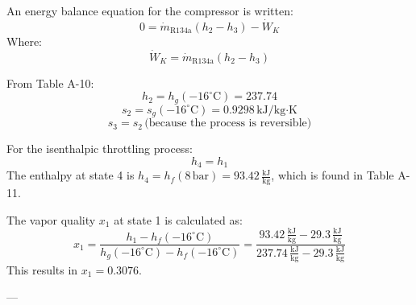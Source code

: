 An energy balance equation for the compressor is written:  
\[
0 = \dot{m}_{\text{R134a}} \left( h_2 - h_3 \right) - \dot{W}_K
\]  
Where:  
\[
\dot{W}_K = \dot{m}_{\text{R134a}} \left( h_2 - h_3 \right)
\]  

From Table A-10:  
\[
h_2 = h_g(-16^\circ \text{C}) = 237.74  
\]  
\[
s_2 = s_g(-16^\circ \text{C}) = 0.9298 \, \text{kJ/kg·K}  
\]  
\[
s_3 = s_2 \, \text{(because the process is reversible)}  
\]

For the isenthalpic throttling process:  
\[
h_4 = h_1
\]
The enthalpy at state 4 is \( h_4 = h_f(8 \, \text{bar}) = 93.42 \, \frac{\text{kJ}}{\text{kg}} \), which is found in Table A-11.  

The vapor quality \( x_1 \) at state 1 is calculated as:  
\[
x_1 = \frac{h_1 - h_f(-16^\circ \text{C})}{h_g(-16^\circ \text{C}) - h_f(-16^\circ \text{C})} = \frac{93.42 \, \frac{\text{kJ}}{\text{kg}} - 29.3 \, \frac{\text{kJ}}{\text{kg}}}{237.74 \, \frac{\text{kJ}}{\text{kg}} - 29.3 \, \frac{\text{kJ}}{\text{kg}}}
\]
This results in \( x_1 = 0.3076 \).  

---